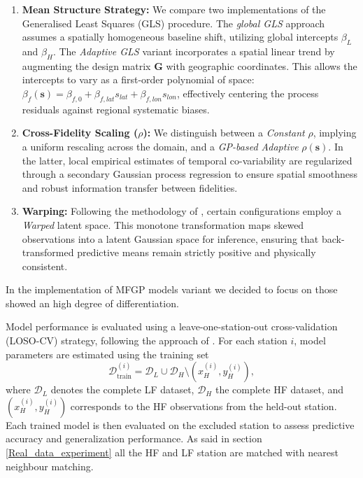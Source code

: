 \documentclass[12pt]{article}
\begin{document}
\begin{enumerate}
    \item \textbf{Mean Structure Strategy:} We compare two implementations of the Generalised Least Squares (GLS) procedure. The \textit{global GLS} approach assumes a spatially homogeneous baseline shift, utilizing global intercepts $\beta_L$ and $\beta_H$. The \textit{Adaptive GLS} variant incorporates a spatial linear trend by augmenting the design matrix $\bm{G}$ with geographic coordinates. This allows the intercepts to vary as a first-order polynomial of space: $\beta_f(\bm{s}) = \beta_{f,0} + \beta_{f,lat}s_{lat} + \beta_{f,lon}s_{lon}$, effectively centering the process residuals against regional systematic biases.
    
    \item \textbf{Cross-Fidelity Scaling ($\rho$):} We distinguish between a \textit{Constant} $\rho$, implying a uniform rescaling across the domain, and a \textit{GP-based Adaptive} $\rho(\bm{s})$. In the latter, local empirical estimates of temporal co-variability are regularized through a secondary Gaussian process regression to ensure spatial smoothness and robust information transfer between fidelities.
    
    \item \textbf{Warping:} Following the methodology of \citet{colombo2025warped}, certain configurations employ a \textit{Warped} latent space. This monotone transformation maps skewed observations into a latent Gaussian space for inference, ensuring that back-transformed predictive means remain strictly positive and physically consistent.
\end{enumerate}
In the implementation of MFGP models variant we decided to focus on those showed an high degree of differentiation.  



Model performance is evaluated using a leave-one-station-out cross-validation 
(LOSO-CV) strategy, following the approach of \citet{otto2024spatiotemporal}. 
For each station $i$, model parameters are estimated using the training set
\[
\mathcal{D}_{\text{train}}^{(i)} = \mathcal{D}_L \cup \mathcal{D}_H 
\setminus \left( x_H^{(i)}, y_H^{(i)} \right),
\]
where $\mathcal{D}_L$ denotes the complete LF dataset, $\mathcal{D}_H$ the complete 
HF dataset, and $\left( x_H^{(i)}, y_H^{(i)} \right)$ corresponds to the HF 
observations from the held-out station. Each trained model is then evaluated on the 
excluded station to assess predictive accuracy and generalization performance. As said in section \ref{Real_data_experiment} all the HF and LF station are matched with nearest neighbour matching.
\end{document}
